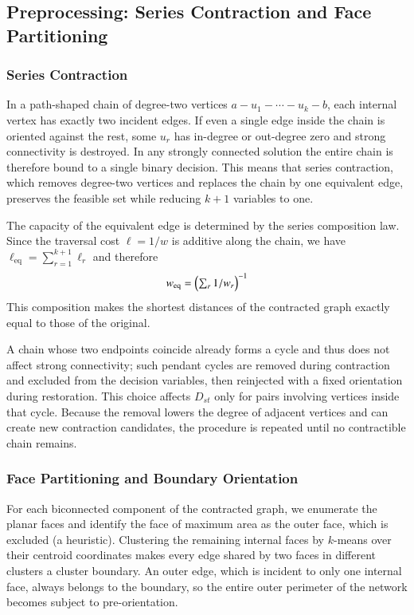 \documentclass[twocolumn,a4paper]{article}
\begin{document}
\subsection{Preprocessing: Series Contraction and Face Partitioning} \label{subsec:method_pre}

\subsubsection*{Series Contraction}

In a path-shaped chain of degree-two vertices \(a-u_1-\cdots-u_k-b\), each internal vertex has exactly two incident edges. If even a single edge inside the chain is oriented against the rest, some \(u_r\) has in-degree or out-degree zero and strong connectivity is destroyed. In any strongly connected solution the entire chain is therefore bound to a single binary decision. This means that series contraction, which removes degree-two vertices and replaces the chain by one equivalent edge, preserves the feasible set while reducing \(k+1\) variables to one.

The capacity of the equivalent edge is determined by the series composition law. Since the traversal cost \(\ell=1/w\) is additive along the chain, we have \(\ell_{\mathrm{eq}}=\sum_{r=1}^{k+1}\ell_r\) and therefore
\begin{equation}
    w_{\mathrm{eq}}=\Bigl(\textstyle\sum_{r}1/w_{r}\Bigr)^{-1}
\end{equation}
This composition makes the shortest distances of the contracted graph exactly equal to those of the original.

A chain whose two endpoints coincide already forms a cycle and thus does not affect strong connectivity; such pendant cycles are removed during contraction and excluded from the decision variables, then reinjected with a fixed orientation during restoration. This choice affects \(D_{st}\) only for pairs involving vertices inside that cycle. Because the removal lowers the degree of adjacent vertices and can create new contraction candidates, the procedure is repeated until no contractible chain remains.

\subsubsection*{Face Partitioning and Boundary Orientation}

For each biconnected component of the contracted graph, we enumerate the planar faces and identify the face of maximum area as the outer face, which is excluded (a heuristic). Clustering the remaining internal faces by $k$-means over their centroid coordinates makes every edge shared by two faces in different clusters a cluster boundary. An outer edge, which is incident to only one internal face, always belongs to the boundary, so the entire outer perimeter of the network becomes subject to pre-orientation.
\end{document}
